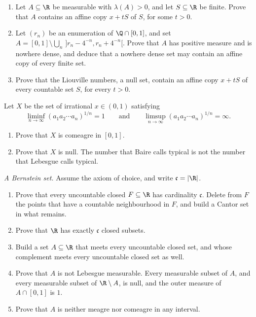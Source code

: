 \begin{exercise}[$\star\star$]\label{pb:similar}
\begin{enumerate}[label=(\alph*)]
\item Let $A\subseteq\R$ be measurable with $\lambda(A)>0$, and let $S\subseteq\R$ be finite. Prove that $A$ contains an affine copy $x+tS$ of $S$, for some $t>0$.
\item Let $(r_n)$ be an enumeration of $\Q\cap[0,1]$, and set $A=[0,1]\setminus\bigcup_n\,]r_n-4^{-n},r_n+4^{-n}[$. Prove that $A$ has positive measure and is nowhere dense, and deduce that a nowhere dense set may contain an affine copy of every finite set.
\item Prove that the Liouville numbers, a null set, contain an affine copy $x+tS$ of every countable set $S$, for every $t>0$.
\end{enumerate}
\end{exercise}

\begin{exercise}[$\star\star$]\label{pb:typicalcf}
Let $X$ be the set of irrational $x\in(0,1)$ satisfying
\[
\liminf_{n\to\infty}(a_1a_2\cdots a_n)^{1/n}=1\qquad\text{and}\qquad\limsup_{n\to\infty}(a_1a_2\cdots a_n)^{1/n}=\infty.
\]
\begin{enumerate}[label=(\alph*)]
\item Prove that $X$ is comeagre in $[0,1]$.
\item Prove that $X$ is null. The number that Baire calls typical is not the number that Lebesgue calls typical.
\end{enumerate}
\end{exercise}

\begin{exercise}[$\star\star\star$]\label{pb:bernsteinset}
\emph{A Bernstein set.} Assume the axiom of choice, and write $\mathfrak c=|\R|$.
\begin{enumerate}[label=(\alph*)]
\item Prove that every uncountable closed $F\subseteq\R$ has cardinality $\mathfrak c$. Delete from $F$ the points that have a countable neighbourhood in $F$, and build a Cantor set in what remains.
\item Prove that $\R$ has exactly $\mathfrak c$ closed subsets.
\item Build a set $A\subseteq\R$ that meets every uncountable closed set, and whose complement meets every uncountable closed set as well.
\item Prove that $A$ is not Lebesgue measurable. Every measurable subset of $A$, and every measurable subset of $\R\setminus A$, is null, and the outer measure of $A\cap[0,1]$ is $1$.
\item Prove that $A$ is neither meagre nor comeagre in any interval.
\end{enumerate}
\end{exercise}


